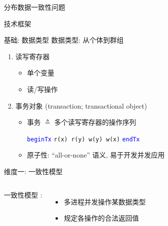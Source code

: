 \begin{frame}{分布数据一致性问题}
\end{frame}
\begin{frame}{技术框架}
\end{frame}
\begin{frame}[fragile]{基础: 数据类型}
  数据类型: 从个体到群组
  \begin{enumerate}
	\setlength{\itemsep}{3pt}
	\item 读写寄存器~\footnotemark[1]
	  \begin{itemize}
		\item 单个变量
		\item 读/写操作
	  \end{itemize}
	  \pause
	\item 事务对象 {\small (transaction; transactional object)}
	  \begin{itemize}
		\setlength{\itemsep}{3pt}
		\item 事务 $\triangleq$ 多个读写寄存器的操作序列\\
		  \begin{center}
			\textcolor{blue}{\texttt{beginTx}} \texttt{r(x) r(y) w(y) w(x)} \textcolor{blue}{\texttt{endTx}}
		  \end{center}
		\item 原子性: ``all-or-none'' 语义, 易于开发并发应用
	  \end{itemize}
  \end{enumerate}
\end{frame}
\begin{frame}{维度一: 一致性模型}
  \begin{columns}
	  一致性模型  :
	  \vspace{0.20cm}
	  \begin{itemize}
		\item 多进程并发操作某数据类型
		\item 规定各操作的合法返回值
	  \end{itemize}
  \end{columns}

\end{frame}
